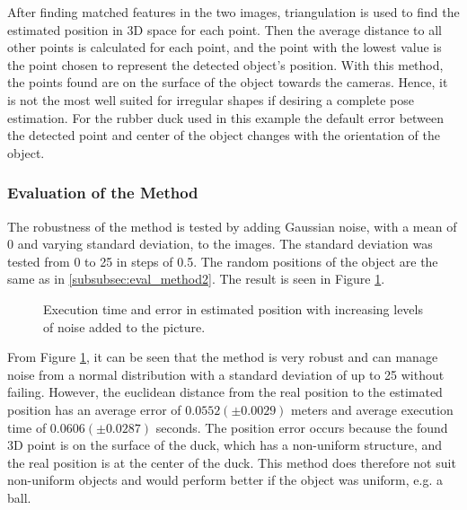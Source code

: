 \documentclass[../main.tex]{subfiles}
\begin{document}
After finding matched features in the two images, triangulation is used to find the estimated position in 3D space for each point. Then the average distance to all other points is calculated for each point, and the point with the lowest value is the point chosen to represent the detected object's position. With this method, the points found are on the surface of the object towards the cameras. Hence, it is not the most well suited for irregular shapes if desiring a complete pose estimation. For the rubber duck used in this example the default error between the detected point and center of the object changes with the orientation of the object.

\subsubsection{Evaluation of the Method} \label{subsubsec:eval_method3}
The robustness of the method is tested by adding Gaussian noise, with a mean of 0 and varying standard deviation, to the images. The standard deviation was tested from 0 to 25 in steps of 0.5. The random positions of the object are the same as in \ref{subsubsec:eval_method2}. The result is seen in Figure \ref{fig:sparse_noise}.

\begin{figure}[H]
    \centering
    \noindent{}
    \caption{Execution time and error in estimated position with increasing levels of noise added to the picture.}
    \label{fig:sparse_noise}
\end{figure}

From Figure \ref{fig:sparse_noise}, it can be seen that the method is very robust and can manage noise from a normal distribution with a standard deviation of up to 25 without failing. However, the euclidean distance from the real position to the estimated position has an average error of $0.0552 (\pm 0.0029)$ meters and average execution time of $0.0606 (\pm 0.0287)$ seconds. The position error occurs because the found 3D point is on the surface of the duck, which has a non-uniform structure, and the real position is at the center of the duck. This method does therefore not suit non-uniform objects and would perform better if the object was uniform, e.g. a ball.
\end{document}
